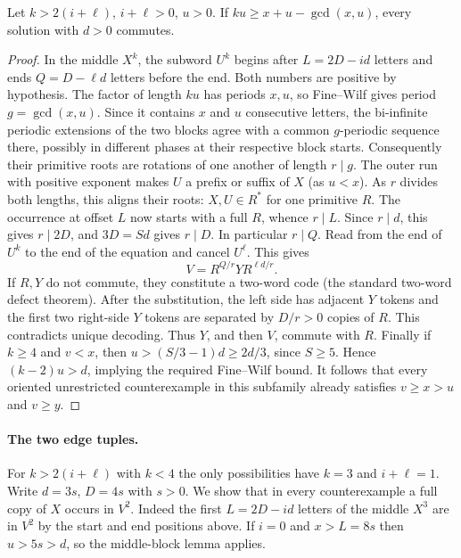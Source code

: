 \begin{lemma}
Let $k>2(i+\ell)$, $i+\ell>0$, $u>0$.
If $ku\ge x+u-\gcd(x,u)$, every solution with $d>0$ commutes.
\end{lemma}
\begin{proof}
In the middle $X^k$, the subword $U^k$ begins after $L=2D-id$
letters and ends $Q=D-\ell d$ letters before the end. Both numbers
are positive by hypothesis. The factor of length $ku$ has periods
$x,u$, so Fine--Wilf gives period $g=\gcd(x,u)$. Since it contains
$x$ and $u$ consecutive letters, the bi-infinite periodic extensions
of the two blocks agree with a common $g$-periodic sequence there,
possibly in different phases at their respective block starts.
Consequently their primitive roots are rotations of one another of
length $r\mid g$. The outer run with positive exponent makes $U$ a
prefix or suffix of $X$ (as $u<x$). As $r$ divides both lengths, this
aligns their roots: $X,U\in R^*$ for one primitive $R$.
The occurrence at offset $L$ now starts with a full $R$, whence $r\mid L$.
Since $r\mid d$, this gives $r\mid 2D$, and $3D=Sd$ gives $r\mid D$.
In particular $r\mid Q$. Read from the end of $U^k$ to the end of
the equation and cancel $U^\ell$. This gives
\[
 V=R^{Q/r}Y R^{\ell d/r}.
\]
If $R,Y$ do not commute, they constitute a two-word code (the standard
two-word defect theorem). After the substitution, the left side has
adjacent $Y$ tokens and the first two right-side $Y$ tokens are
separated by $D/r>0$ copies of $R$. This contradicts unique decoding.
Thus $Y$, and then $V$, commute with $R$.
Finally if $k\ge4$ and $v<x$, then $u>(S/3-1)d\ge2d/3$, since
$S\ge5$. Hence $(k-2)u>d$, implying the required Fine--Wilf bound.
It follows that every oriented unrestricted counterexample in this
subfamily already satisfies $v\ge x>u$ and $v\ge y$.
\end{proof}

\paragraph{The two edge tuples.}
For $k>2(i+\ell)$ with $k<4$ the only possibilities have $k=3$ and
$i+\ell=1$. Write $d=3s$, $D=4s$ with $s>0$.
We show that in every counterexample a full copy of $X$ occurs in $V^2$.
Indeed the first $L=2D-id$ letters of the middle $X^3$ are in $V^2$
by the start and end positions above. If $i=0$ and $x>L=8s$ then
$u>5s>d$, so the middle-block lemma applies.

